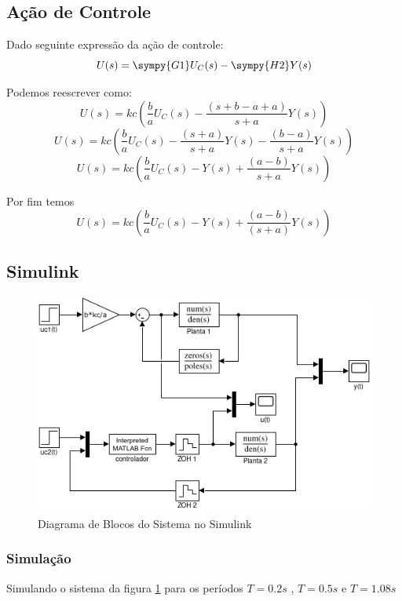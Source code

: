 \documentclass[a4paper,11pt]{article}
\begin{document}
\subsection{Ação de Controle}

Dado seguinte expressão da ação de controle:
$$U(s) = \sympy{G1}U_C(s) - \sympy{H2}Y(s)$$

Podemos reescrever como:
$$U(s) = kc\left( \frac{b}{a}U_C(s) - \frac{(s+b-a+a)}{s+a}Y(s) \right)$$
$$U(s) = kc\left( \frac{b}{a}U_C(s) - \frac{(s+a)}{s+a}Y(s) - \frac{(b-a)}{s+a}Y(s) \right)$$
$$U(s) = kc\left( \frac{b}{a}U_C(s) - Y(s) + \frac{(a-b)}{s+a}Y(s) \right)$$

Por fim temos
\begin{equation}
    U(s) = kc\left( \frac{b}{a}U_C(s) - Y(s) + \frac{(a-b)}{(s+a)}Y(s) \right)
\end{equation}

\subsection{Simulink}

\begin{figure}[H]
    \centering
    \includegraphics[width=0.8\linewidth]{img/exsim2model.png}
    \caption{Diagrama de Blocos do Sistema no Simulink}
    \label{fig:ex2-simulink}
\end{figure}

\subsubsection{Simulação}

Simulando o sistema da figura \ref{fig:ex2-simulink} para os períodos $T=0.2s$ , $T=0.5s$ e $T=1.08s$ 
\end{document}
